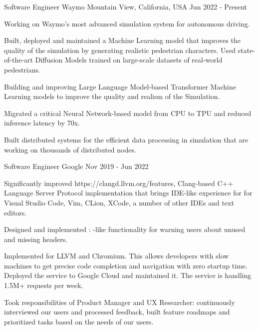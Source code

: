 
\begin{cventries}

  \cventry
    {Software Engineer}
    {Waymo}
    {Mountain View, California, USA}
    {Jun 2022 - Present}
    {
      \begin{cvitems}
        \item Working on Waymo's most advanced simulation system for autonomous
          driving.
        \item Built, deployed and maintained a Machine Learning model that 
          improves the quality of the simulation by generating realistic
          pedestrian characters. Used state-of-the-art Diffusion Models trained
          on large-scale datasets of real-world pedestrians.
        \item Building and improving Large Language Model-based Transformer
          Machine Learning models to improve the quality and realism of the
          Simulation.
        \item Migrated a critical Neural Network-based model from CPU to TPU and
          reduced inference latency by 70x.
        \item Built distributed systems for the efficient data processing in
          simulation that are working on thousands of distributed nodes.
      \end{cvitems}
    }

  \cventry
    {Software Engineer}
    {Google}
    {}
    {Nov 2019 - Jun 2022}
    {
      \begin{cvitems}
        \item Significantly improved 
	  {https://clangd.llvm.org/features}, Clang-based C++ Language
	  Server Protocol implementation that brings IDE-like experience for
	  for Visual Studio Code, Vim, CLion, XCode, a number of
	  other IDEs and text editors.
        \item Designed and implemented :
	  -like functionality
          for warning users about unused and missing headers.
        \item Implemented  for LLVM and Chromium. This
          allows developers with slow machines to get precise code completion
          and navigation with zero startup time. Deployed the service to Google
	  Cloud and maintained it. The service is handling 1.5M+ requests
          per week.
        \item Took responsibilities of Product Manager and UX Researcher:
          continuously interviewed our users and processed feedback, built
          feature roadmaps and prioritized tasks based on the needs of our
          users.
      \end{cvitems}
    }


\end{cventries}
